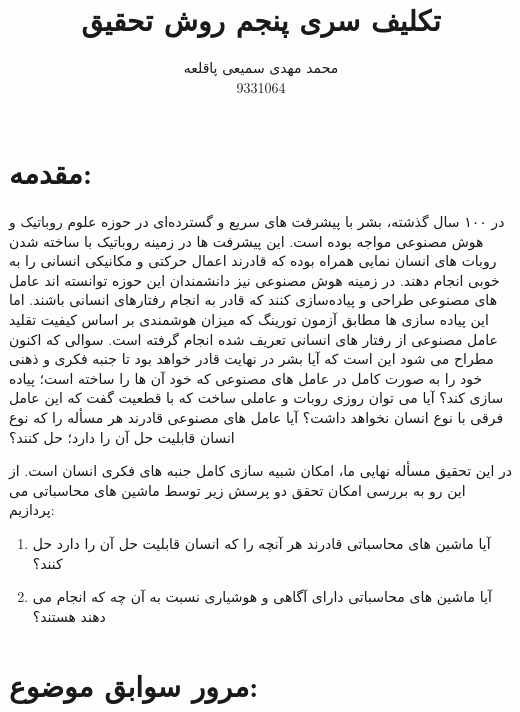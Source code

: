 \documentclass{report}
\begin{document}
\title{ تکلیف سری پنجم روش تحقیق}
\author{محمد مهدی سمیعی پاقلعه\\ 9331064 }
\date{}
\maketitle
\section*{مقدمه:}

\paragraph{} \hspace{0pt}
در ۱۰۰ سال گذشته، بشر با پیشرفت های سریع و گسترده‌ای در حوزه علوم روباتیک و هوش مصنوعی مواجه بوده است. این پیشرفت ها در زمینه روباتیک با ساخته شدن روبات های انسان نمایی همراه بوده که قادرند اعمال حرکتی و مکانیکی انسانی را به خوبی انجام دهند. در زمینه هوش مصنوعی نیز دانشمندان این حوزه توانسته اند عامل های مصنوعی طراحی و پیاده‌سازی کنند که قادر به انجام رفتارهای انسانی باشند. اما این پیاده سازی ها مطابق آزمون تورینگ 
که میزان هوشمندی بر اساس کیفیت تقلید عامل مصنوعی از رفتار های انسانی تعریف شده انجام گرفته است. سوالی که اکنون مطراح می شود این است که آیا بشر در نهایت قادر خواهد بود تا جنبه فکری و ذهنی خود را به صورت کامل در عامل های مصنوعی که خود آن ها را ساخته است؛ پیاده سازی کند؟ آیا می توان روزی روبات و عاملی ساخت که با قطعیت گفت که این عامل فرقی با نوع انسان نخواهد داشت؟ آیا عامل های مصنوعی قادرند هر مسأله را که نوع انسان قابلیت حل آن را دارد؛ حل کنند؟


در این تحقیق مسأله نهایی ما، امکان شبیه سازی کامل جنبه های فکری انسان است. از این رو به بررسی امکان تحقق دو پرسش زیر توسط ماشین های محاسباتی می پردازیم:
\begin{enumerate}
  \item  آیا ماشین های محاسباتی قادرند هر آنچه را که انسان قابلیت حل آن را دارد حل کنند؟
  \item  آیا ماشین های محاسباتی دارای آگاهی و هوشیاری نسبت به آن چه که انجام می دهند هستند؟
\end{enumerate}

\section*{مرور سوابق موضوع:}
\end{document}

